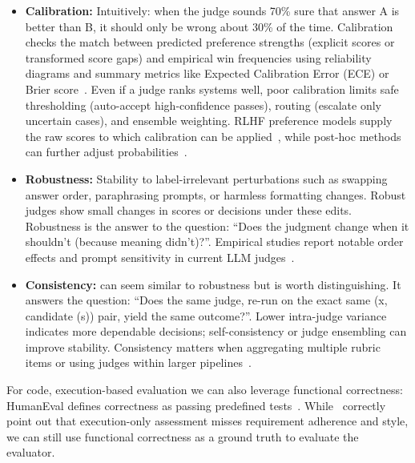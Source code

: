 \begin{itemize}
\item \textbf{Calibration:} Intuitively: when the judge sounds 70\% sure that answer A is better than B, it should only be wrong about 30\% of the time. Calibration checks the match between predicted preference strengths (explicit scores or transformed score gaps) and empirical win frequencies using reliability diagrams and summary metrics like Expected Calibration Error (ECE) or Brier score~\cite{guo2017calibration, brier1950verification}. Even if a judge ranks systems well, poor calibration limits safe thresholding (auto-accept high-confidence passes), routing (escalate only uncertain cases), and ensemble weighting. RLHF preference models supply the raw scores to which calibration can be applied~\cite{stiennon2020learning, ouyang2022training}, while post-hoc methods can further adjust probabilities~\cite{niculescu2005predicting}.
\item \textbf{Robustness:} Stability to label-irrelevant perturbations such as swapping answer order, paraphrasing prompts, or harmless formatting changes. Robust judges show small changes in scores or decisions under these edits. Robustness is the answer to the question: “Does the judgment change when it shouldn’t (because meaning didn’t)?”. Empirical studies report notable order effects and prompt sensitivity in current LLM judges~\cite{li2024_llmsasjudges, hada2024metal, zheng2023judgelm}.
\item \textbf{Consistency:} can seem similar to robustness but is worth distinguishing. It answers the question: “Does the same judge, re-run on the exact same (x, candidate (s)) pair, yield the same outcome?”. Lower intra-judge variance indicates more dependable decisions; self-consistency or judge ensembling can improve stability. Consistency matters when aggregating multiple rubric items or using judges within larger pipelines~\cite{li2024_llmsasjudges}.
\end{itemize}

For code, execution-based evaluation we can also leverage functional correctness: HumanEval defines correctness as passing predefined tests~\citep{chen2021evaluating}. While~\cite{li2024_llmsasjudges} correctly point out that execution-only assessment misses requirement adherence and style, we can still use functional correctness as a ground truth to evaluate the evaluator.

